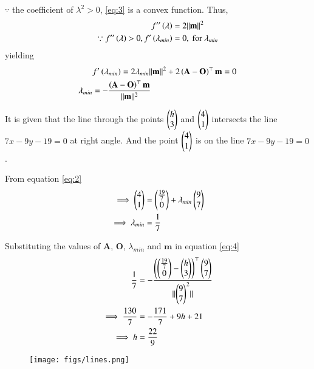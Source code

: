 \documentclass[journal,12pt,twocolumn]{IEEEtran}
\renewcommand{\vec}[1]{\boldsymbol{\mathbf{#1}}}
\begin{document}
$\because$ the coefficient of $\lambda^2> 0$, \eqref{eq:3} is a convex function.
Thus,
\begin{align}
    f^{\prime\prime}\brak{\lambda}                                            & = 2\norm{\vec{m}}^2             \\
    \because f^{\prime\prime}\brak{\lambda} > 0, f^\prime\brak{\lambda_{min}} & = 0, \text{ for } \lambda_{min}
\end{align}
yielding
\begin{align}
                  & f^\prime\brak{\lambda_{min}} =  2\lambda_{min}\norm{\vec{m}}^2 + 2\brak{\vec{A}-\vec{O}}^\top\vec{m}  = 0 \\
    \label{eq:4}
    \lambda_{min} & = -\frac{\brak{\vec{A}-\vec{O}}^\top\vec{m}}{\norm{\vec{m}}^2}
\end{align}

It is given that the line through the points $\begin{pmatrix}h \\ 3\end{pmatrix}$ and $\begin{pmatrix}4 \\ 1\end{pmatrix}$ intersects the line $7{x} - 9{y} - 19 = 0$ at right angle. And the point $\begin{pmatrix}4 \\ 1\end{pmatrix}$ is on the line $7{x} - 9{y} - 19 = 0$.

From equation \eqref{eq:2}
\begin{align}
    \implies \begin{pmatrix}4 \\ 1\end{pmatrix} &= \begin{pmatrix}\frac{19}{7} \\ 0\end{pmatrix} + \lambda_{min}\begin{pmatrix}9 \\ 7\end{pmatrix} \\
    \implies \lambda_{min} &= \frac{1}{7} 
\end{align}


Substituting the values of $\vec{A}$, $\vec{O}$, $\lambda_{min}$ and $\vec{m}$ in equation \eqref{eq:4}
\begin{align}
    \frac{1}{7} &= -\frac{\left(\begin{pmatrix}\frac{19}{7} \\ 0\end{pmatrix} -\begin{pmatrix}h \\ 3\end{pmatrix}\right)^\top\begin{pmatrix}9 \\ 7\end{pmatrix}}{\lVert\begin{pmatrix}9 \\ 7\end{pmatrix}^2\rVert}\\
    \implies \frac{130}{7} &= -\frac{171}{7} + 9{h} + 21\\
    \implies h &= \frac{22}{9}
\end{align}

\begin{figure}[!htb]
    \centering
    \texttt{[image: figs/lines.png]}
    \caption{}
    \label{fig:line}
\end{figure}
\end{document}
